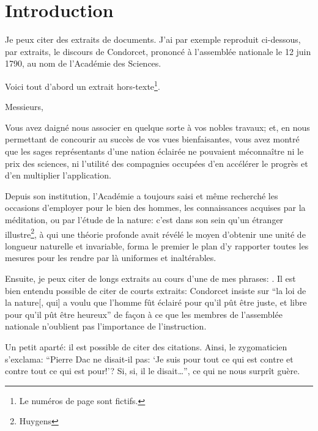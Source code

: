 \chapter*{Introduction}

Je peux citer des extraits de documents. J'ai par exemple reproduit
ci-dessous, par extraits, le discours de Condorcet, prononcé à
l'assemblée nationale le 12 juin 1790, au nom de l'Académie des
Sciences.

Voici tout d'abord un extrait \og hors-texte\fg{}\footnote{Le numéros
  de page sont fictifs.}.
%
\begin{displayquote}[p.~27]
  Messieurs,

  Vous avez daigné nous associer en quelque sorte à vos nobles
  travaux; et, en nous permettant de concourir au succès de vos vues
  bienfaisantes, vous avez montré que les sages représentants d'une
  nation éclairée ne pouvaient méconnaître ni le prix des sciences, ni
  l'utilité des compagnies occupées d'en accélérer le progrès et d'en
  multiplier l'application.

  Depuis son institution, l'Académie a toujours saisi et même
  recherché les occasions d'employer pour le bien des hommes, les
  connaissances acquises par la méditation, ou par l'étude de la
  nature: c'est dans son sein qu'un étranger
  illustre\footnote{Huygens}, à qui une théorie profonde avait révélé
  le moyen d'obtenir une unité de longueur naturelle et invariable,
  forma le premier le plan d'y rapporter toutes les mesures pour les
  rendre par là uniformes et inaltérables.
\end{displayquote}
%

Ensuite, je peux citer de longs extraits au cours d'une de mes
phrases: . Il est bien entendu possible de citer de courts extraits:
Condorcet insiste sur \enquote{la loi de la nature[, qui] a voulu que
  l'homme fût éclairé pour qu'il pût être juste, et libre pour qu'il
  pût être heureux} de façon à ce que les membres de l'assemblée
nationale n'oublient pas l'importance de l'instruction.

Un petit aparté: il est possible de citer des citations. Ainsi, le
zygomaticien s'exclama: \enquote{Pierre Dac ne disait-il pas:
  \enquote{Je suis pour tout ce qui est contre et contre tout ce qui
    est pour!}? Si, si, il le disait\ldots{}}, ce qui ne nous surprît
guère.


